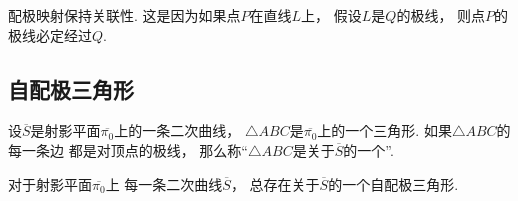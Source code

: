配极映射保持关联性.
这是因为如果点\(P\)在直线\(L\)上，
假设\(L\)是\(Q\)的极线，
则点\(P\)的极线必定经过\(Q\).

\subsection{自配极三角形}
\begin{definition}
设\(\overline{S}\)是射影平面\(\overline{\pi_0}\)上的一条二次曲线，
\(\triangle ABC\)是\(\overline{\pi_0}\)上的一个三角形.
如果\(\triangle ABC\)的每一条边
都是对顶点的极线，
那么称“\(\triangle ABC\)是关于\(\overline{S}\)的一个”.
\end{definition}

\begin{theorem}
对于射影平面\(\overline{\pi_0}\)上
每一条二次曲线\(\overline{S}\)，
总存在关于\(\overline{S}\)的一个自配极三角形.
\end{theorem}


